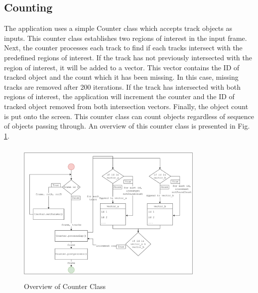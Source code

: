 \documentclass[12pt,a4paper,fleqn]{report}
\begin{document}
\subsection{Counting}
The application uses a simple Counter class which accepts track objects as inputs. 
This counter class establishes two regions of interest in the input frame. 
Next, the counter processes each track to find if each tracks intersect with the predefined regions
of interest.
If the track has not previously intersected with the region of interest, it will be added to a vector. 
This vector contains the ID of tracked object and the count which it has been missing. 
In this case, missing tracks are removed after 200 iterations. 
If the track has intersected with both regions of interest, the application will increment the
counter and the ID of tracked object removed from both intersection vectors. 
Finally, the object count is put onto the screen.
This counter class can count objects regardless of sequence of objects passing through.
An overview of this counter class is presented in Fig. \ref{fig:counterflow}.

\begin{figure}[htbp]
    \begin{center}
        \includegraphics[width=0.8\textwidth,height=7cm]{figures/counterflow.png}
    \end{center}
    \caption{Overview of Counter Class}
    \label{fig:counterflow}
\end{figure}
\end{document}
